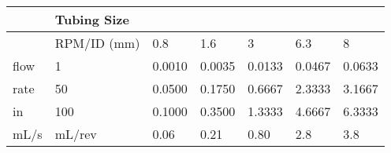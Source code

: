 \documentclass[letterpaper,10pt,english]{sphinxmanual}
\begin{document}
\begin{savenotes}\sphinxattablestart
\centering
{}
\label{\detokenize{Acid_Rain/Acid_Rain:id3}}\label{\detokenize{Acid_Rain/Acid_Rain:table-acid-pump-tubing}}
\sphinxaftercaption
\begin{tabulary}{\linewidth}[t]{|T|T|T|T|T|T|T|}
\hline
\sphinxstyletheadfamily &\sphinxstyletheadfamily 
Tubing Size
&
&
&
&
&
\\
\hline&
RPM/ID (mm)
&
0.8
&
1.6
&
3
&
6.3
&
8
\\
\hline
flow
&
1
&
0.0010
&
0.0035
&
0.0133
&
0.0467
&
0.0633
\\
\hline
rate
&
50
&
0.0500
&
0.1750
&
0.6667
&
2.3333
&
3.1667
\\
\hline
in
&
100
&
0.1000
&
0.3500
&
1.3333
&
4.6667
&
6.3333
\\
\hline
mL/s
&
mL/rev
&
0.06
&
0.21
&
0.80
&
2.8
&
3.8
\\
\hline
\end{tabulary}
\par
\sphinxattableend\end{savenotes}
\end{document}
